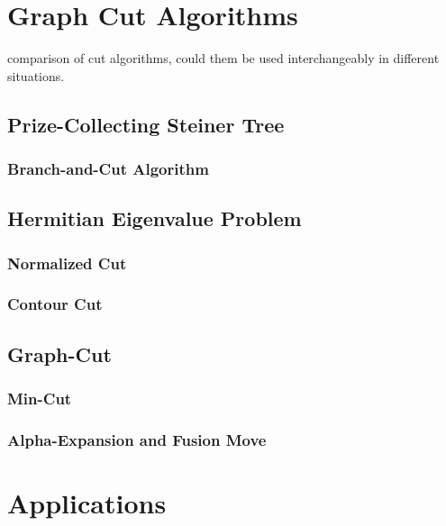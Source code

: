 \documentclass{SMBV12}
\begin{document}
\section{Graph Cut Algorithms}

comparison of cut algorithms, could them be used interchangeably in different situations.

\subsection{Prize-Collecting Steiner Tree}

\cite{ljubic2006algorithmic}

\subsubsection{Branch-and-Cut Algorithm}

\subsection{Hermitian Eigenvalue Problem}

\subsubsection{Normalized Cut}

\cite{shi2000normalized}

\subsubsection{Contour Cut}

\cite{zhu2007untangling}
\cite{KenGalShi2011}

\subsection{Graph-Cut}

\subsubsection{Min-Cut}

\subsubsection{Alpha-Expansion and Fusion Move}

\section{Applications}
\end{document}
